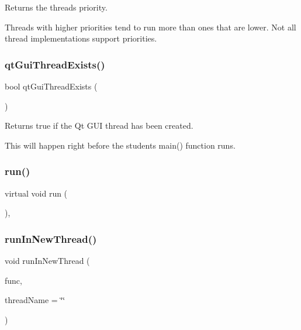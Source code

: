 Returns the thread\textquotesingle{}s priority. 

Threads with higher priorities tend to run more than ones that are lower. Not all thread implementations support priorities. \mbox{\label{classGThread_afee663b5d7998135c2aab0585b2ad37f}} 
\subsubsection{\texorpdfstring{qt\+Gui\+Thread\+Exists()}{qtGuiThreadExists()}}
{\footnotesize\ttfamily bool qt\+Gui\+Thread\+Exists (\begin{DoxyParamCaption}{ }\end{DoxyParamCaption})\hspace{0.3cm}{\ttfamily [static]}}



Returns true if the Qt G\+UI thread has been created. 

This will happen right before the student\textquotesingle{}s main() function runs. \mbox{\label{classGThread_a18954417d3124a8095783ea13dc6d00b}} 
\subsubsection{\texorpdfstring{run()}{run()}}
{\footnotesize\ttfamily virtual void run (\begin{DoxyParamCaption}{ }\end{DoxyParamCaption})\hspace{0.3cm}{\ttfamily [protected]}, {}}

\mbox{\label{classGThread_ad70a32318f3f0a9cf25582379c6d7ffb}} 
\subsubsection{\texorpdfstring{run\+In\+New\+Thread()}{runInNewThread()}}
{\footnotesize\ttfamily void run\+In\+New\+Thread (\begin{DoxyParamCaption}\item[{G\+Thunk}]{func,  }\item[{const std\+::string \&}]{thread\+Name = {\ttfamily \char`\"{}\char`\"{}} }\end{DoxyParamCaption})\hspace{0.3cm}{\ttfamily [static]}}



